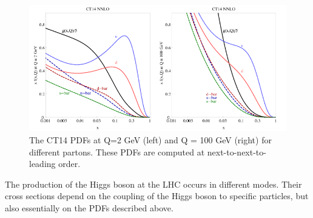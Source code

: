 \begin{figure}[H]
    \centering
    \includegraphics[width=\textwidth]{Ch1/Img/PDFs.png}
    \caption{The CT14 PDFs at Q=2 GeV (left) and Q = 100 GeV (right) for different partons. These PDFs are computed at next-to-next-to-leading order.}
    \label{fig:chap1:H2012:PDF}
\end{figure}

The production of the Higgs boson at the LHC occurs in different modes. Their cross sections depend on the coupling of the Higgs boson to specific particles, but also essentially on the PDFs described above.
